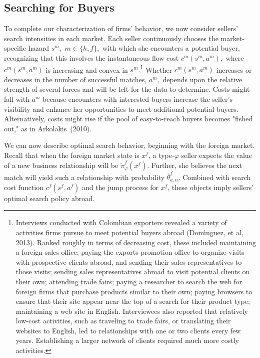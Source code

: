 \documentclass[12pt]{article}
\begin{document}
\subsection{Searching for Buyers}

To complete our characterization of firms' behavior, we now consider
sellers' search intensities in each market. Each seller continuously chooses
the market-specific hazard $s^{m},$ $m\in \{h,f\},$ with which she
encounters a potential buyer, recognizing that this involves the
instantaneous flow cost $c^{m}(s^{m},a^{m}),$ where $c^{m}(s^{m},a^{m})$ is
increasing and convex in $s^{m}.$\footnote{%
Interviews conducted with Colombian exporters revealed a variety of
activities firms pursue to meet potential buyers abroad (Dom\'{\i}nguez, et
al, 2013). Ranked roughly in terms of decreasing cost, these included
maintaining a foreign sales office; paying the exports promotion office to
organize visits with prospective clients abroad, and sending their sales
representatives to those visits; sending sales representatives abroad to
visit potential clients on their own; attending trade fairs; paying a
researcher to search the web for foreign firms that purchase products
similar to their own; paying browsers to ensure that their site appear near
the top of a search for their product type; maintaining a web site in
English. Interviewees also reported that relatively low-cost activities,
such as traveling to trade fairs, or translating their websites to English,
led to relationships with one or two clients every few years. Establishing a
larger network of clients required much more costly activities.} Whether $%
c^{m}(s^{m},a^{m})$ increases or decreases in the number of successful
matches, $a^{m},$ depends upon the relative strength of several forces and
will be left for the data to determine. Costs might fall with $a^{m}$
because encounters with interested buyers increase the seller's visibility
and enhance her opportunities to meet additional potential buyers.
Alternatively, costs might rise if the pool of easy-to-reach buyers becomes
"fished out," as in Arkolakis\ (2010).

We can now describe optimal search behavior, beginning with the foreign
market. Recall that when the foreign market state is $x^{f}$, a type-$%
\varphi $ seller expects the value of a new business relationship will be $%
\widetilde{\pi }_{\varphi }^{f}(x^{f}).$ Further, she believes the next
match will yield such a relationship with probability $\overline{\theta }%
_{a,n}^{f}$. Combined with search cost function $c^{f}(s^{f},a^{f})$ and the
jump process for $x^{f}$, these objects imply sellers' optimal search policy
abroad.
\end{document}
